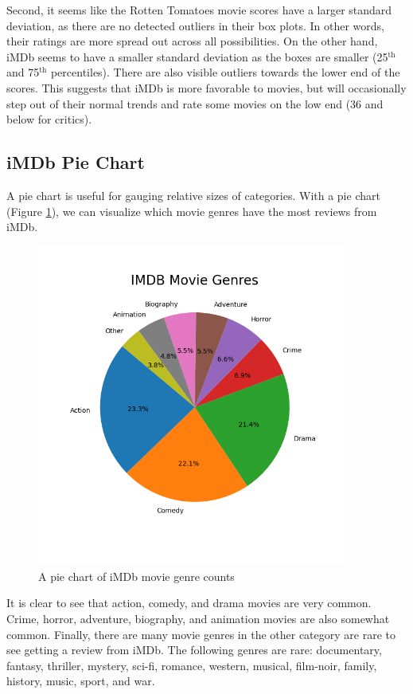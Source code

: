 \documentclass[12pt]{article}
\begin{document}
\noindent Second, it seems like the Rotten Tomatoes movie scores have a larger standard deviation, as there are no detected outliers in their box plots. In other words, their ratings are more spread out across all possibilities. On the other hand, iMDb seems to have a smaller standard deviation as the boxes are smaller (25$^{\text{th}}$ and 75$^{\text{th}}$ percentiles). There are also visible outliers towards the lower end of the scores. This suggests that iMDb is more favorable to movies, but will occasionally step out of their normal trends and rate some movies on the low end (36 and below for critics).

\newpage

\subsection{iMDb Pie Chart}
A pie chart is useful for gauging relative sizes of categories. With a pie chart (Figure \ref{Figure 8}), we can visualize which movie genres have the most reviews from iMDb.

\begin{figure}[h]
\begin{center}
      \includegraphics[width=4in]{figure8.png}
      \caption{A pie chart of iMDb movie genre counts}
      \label{Figure 8}
\end{center}
\end{figure}

\noindent It is clear to see that action, comedy, and drama movies are very common. Crime, horror, adventure, biography, and animation movies are also somewhat common. Finally, there are many movie genres in the other category are rare to see getting a review from iMDb. The following genres are rare: documentary, fantasy, thriller, mystery, sci-fi, romance, western, musical, film-noir, family, history, music, sport, and war. \\
\end{document}
